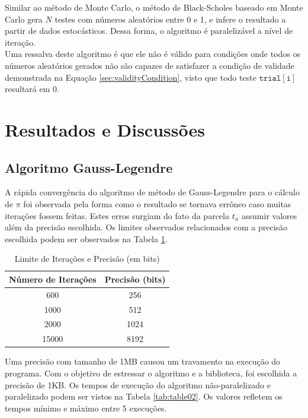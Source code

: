 \documentclass[12pt]{article}
\begin{document}
Similar ao método de Monte Carlo, o método de Black-Scholes baseado em Monte Carlo gera $N$
testes com números aleatórios entre 0 e 1, e infere o resultado a partir de dados estocásticos.
Dessa forma, o algoritmo é paralelizável a nível de iteração. \\
Uma ressalva deste algoritmo é que ele não é válido para condições onde todos os números
aleatórios gerados não são capazes de satisfazer a condição de validade demonstrada
na Equação \ref{sec:validityCondition}, visto que todo teste $\mathtt{trial[i]}$
resultará em 0.\\

\section{Resultados e Discussões}

\subsection{Algoritmo Gauss-Legendre}

A rápida convergência do algoritmo de método de Gauss-Legendre para o cálculo de $\pi$
foi observada pela forma como o resultado se tornava errôneo caso muitas iterações fossem feitas.
Estes erros surgiam do fato da parcela $t_n$ assumir valores além da precisão escolhida.
Os limites observados relacionados com a precisão escolhida podem ser observados na
Tabela \ref{tab:table01}.\\

\begin{table}[h]
\centering
\caption{Limite de Iterações e Precisão (em bits)}
\begin{tabular}{|c|c|}
	\hline
	Número de Iterações & Precisão (bits)\\
	\hline
	600		& 256\\
	1000	& 512\\
	2000	& 1024\\
	15000	& 8192\\
	\hline
\end{tabular}
\label{tab:table01}
\end{table}

Uma precisão com tamanho de 1MB causou um travamento na execução do programa.
Com o objetivo de estressar o algoritmo e a biblioteca, foi escolhida a precisão de 1KB.
Os tempos de execução do algoritmo não-paralelizado e paralelizado podem ser vistos na
Tabela \ref{tab:table02}. Os valores refletem os tempos mínimo e máximo entre 5 execuções.\\
\end{document}
